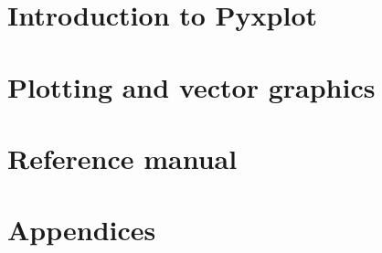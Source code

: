 
\makeatletter
\renewcommand\l@chapter[2]{%
  \ifnum \c@tocdepth >\m@ne
    \addpenalty{-\@highpenalty}%
    \vskip 1.0em \@plus\p@
    \setlength\@tempdima{2em}%
    \begingroup
      \parindent \z@ \rightskip \@pnumwidth
      \parfillskip -\@pnumwidth
      \leavevmode \bfseries
      \advance\leftskip\@tempdima
      \hskip -\leftskip
      #1\nobreak\hfil \nobreak\hb@xt@\@pnumwidth{\hss #2}\par
      \penalty\@highpenalty
    \endgroup
  \fi}
\renewcommand\l@section{\@dottedtocline{1}{2.0em}{3.0em}}
\renewcommand\l@subsection{\@dottedtocline{2}{5.0em}{4.0em}}
\makeatother
\tableofcontents

\listoffigures
{}

\newpage
{}

\part{Introduction to Pyxplot}







\part{Plotting and vector graphics}



\part{Reference manual}









\part{Appendices}
\appendix





\printindex


